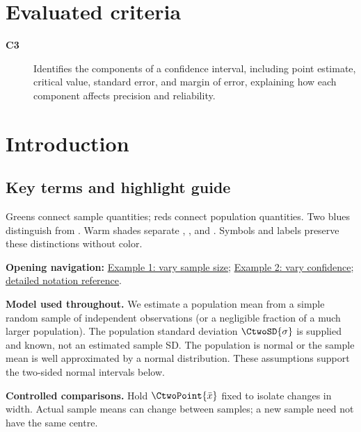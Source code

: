 \section*{Evaluated criteria}
\begin{description}
\item[\textbf{C3}] Identifies the components of a confidence interval, including point estimate, critical value, standard error, and margin of error, explaining how each component affects precision and reliability.
\end{description}

\section{Introduction}\label{sec:c3-introduction}
\subsection{Key terms and highlight guide}\label{subsec:c3-key-terms}
\label{tab:highlight-legend}

Greens connect sample quantities; reds connect population quantities. Two blues distinguish  from . Warm shades separate , ,  and . Symbols and labels preserve these distinctions without color.

\textbf{Opening navigation:} \hyperref[subsec:c3-transport-example]{Example 1: vary sample size};
\hyperref[subsec:c3-quick-check]{Example 2: vary confidence};
\hyperref[tab:notation-reference]{detailed notation reference}.

\textbf{Model used throughout.} We estimate a population mean from a simple random sample of independent observations (or a negligible fraction of a much larger population). The population standard deviation $\CtwoSD{\sigma}$ is supplied and known, not an estimated sample SD. The population is normal or the sample mean is well approximated by a normal distribution. These assumptions support the two-sided normal intervals below.

\textbf{Controlled comparisons.} Hold $\CtwoPoint{\bar{x}}$ fixed to isolate changes in width. Actual sample means can change between samples; a new sample need not have the same centre.
\clearpage
